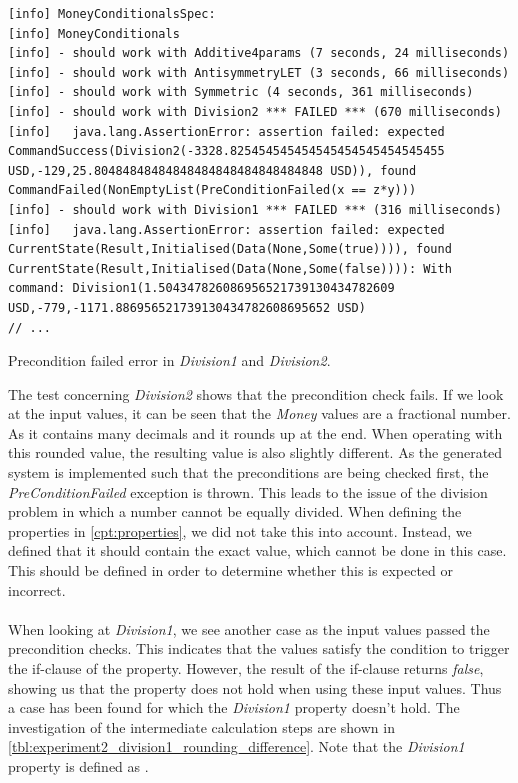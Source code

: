 \FloatBarrier
\begin{sourcecode}[!ht]
\begin{lstlisting}[language=Log]
[info] MoneyConditionalsSpec:
[info] MoneyConditionals
[info] - should work with Additive4params (7 seconds, 24 milliseconds)
[info] - should work with AntisymmetryLET (3 seconds, 66 milliseconds)
[info] - should work with Symmetric (4 seconds, 361 milliseconds)
[info] - should work with Division2 *** FAILED *** (670 milliseconds)
[info]   java.lang.AssertionError: assertion failed: expected CommandSuccess(Division2(-3328.825454545454545454545454545455 USD,-129,25.80484848484848484848484848484848 USD)), found CommandFailed(NonEmptyList(PreConditionFailed(x == z*y)))
[info] - should work with Division1 *** FAILED *** (316 milliseconds)
[info]   java.lang.AssertionError: assertion failed: expected CurrentState(Result,Initialised(Data(None,Some(true)))), found CurrentState(Result,Initialised(Data(None,Some(false)))): With command: Division1(1.504347826086956521739130434782609 USD,-779,-1171.886956521739130434782608695652 USD)
// ...
\end{lstlisting}
\caption{Precondition failed error in \textit{Division1} and \textit{Division2}.}
\label{lst:experiment2_log_second_run}
\end{sourcecode}
\FloatBarrier
The test concerning \textit{Division2} shows that the precondition check fails.
If we look at the input values, it can be seen that the \textit{Money} values
are a fractional number. As it contains many decimals and it rounds up at the
end. When operating with this rounded value, the resulting value is also
slightly different. As the generated system is implemented such that the
preconditions are being checked first, the \textit{PreConditionFailed} exception
is thrown. This leads to the issue of the division problem in which a number
cannot be equally divided. When defining the properties in
\autoref{cpt:properties}, we did not take this into account. Instead, we defined
that it should contain the exact value, which cannot be done in this case. This
should be defined in order to determine whether this is expected or incorrect.\\
\\
When looking at \textit{Division1}, we see another case as the input values
passed the precondition checks. This indicates that the values satisfy the
condition to trigger the if-clause of the property. However, the result of the
if-clause returns \textit{false}, showing us that the property does not hold
when using these input values. Thus a case has been found for which the
\textit{Division1} property doesn't hold. The investigation of the intermediate
calculation steps are shown in
\autoref{tbl:experiment2_division1_rounding_difference}. Note that the
\textit{Division1} property is defined as .

